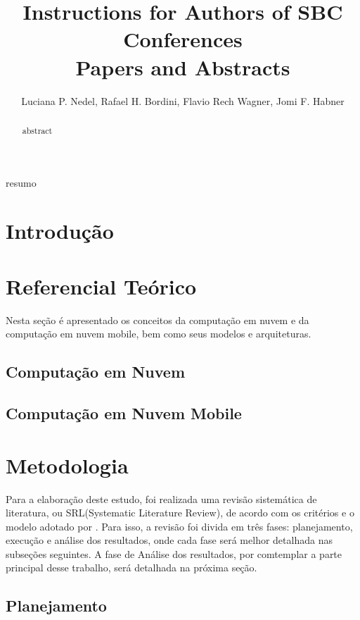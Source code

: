 \documentclass[12pt]{article}
\title{Instructions for Authors of SBC Conferences\\ Papers and Abstracts}
\author{Luciana P. Nedel\inst{1}, Rafael H. Bordini\inst{2}, Flavio Rech
  Wagner\inst{1}, Jomi F. Habner\inst{3} }
\begin{document}
 

\maketitle

\begin{abstract}
  abstract
\end{abstract}

\begin{resumo} 
  resumo
\end{resumo}


\section{Introdução}

\lipsum[1]

\section{Referencial Teórico}

Nesta seção é apresentado os conceitos da computação em nuvem e da computação em nuvem
mobile, bem como seus modelos e arquiteturas.

\subsection{Computação em Nuvem}

\subsection{Computação em Nuvem Mobile}

\section{Metodologia}

Para a elaboração deste estudo, foi realizada uma revisão sistemática de literatura,
ou SRL(Systematic Literature Review), de acordo com os critérios e o modelo adotado 
por \cite{kitchenham2012}. Para isso, a revisão foi divida em três fases: planejamento,
execução e análise dos resultados, onde cada fase será melhor detalhada nas subseções seguintes.
A fase de Análise dos resultados, por comtemplar a parte principal desse trabalho, será detalhada
na próxima seção.

\subsection{Planejamento}
\end{document}
